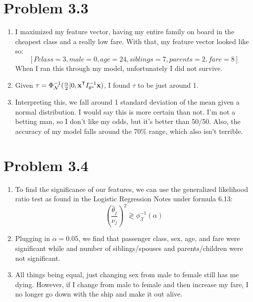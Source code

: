 \documentclass{article}
\begin{document}
\section*{Problem 3.3}
\begin{enumerate}[label=(\alph*)]
  \item I maximized my feature vector, having my entire family on board in the cheapest class and a really low fare. With that, my feature vector looked like so: \[[Pclass=3, male=0, age=24, siblings=7, parents=2, fare=8]\] When I ran this through my model, unfortunately I did not survive.
  \item Given $\tau = \Phi^{-1}_{\mathcal{N}}(\frac{\alpha}{2} | 0, \textbf{x}^{\sf{T}}I^{-1}_{\theta^*}\textbf{x})$, I found $\tau$ to be just around 1.
  \item Interpreting this, we fall around 1 standard deviation of the mean given a normal distribution. I would say this is more certain than not. I'm not a betting man, so I don't like my odds, but it's better than 50/50. Also, the accuracy of my model falls around the 70\% range, which also isn't terrible.
\end{enumerate}

\section*{Problem 3.4}
\begin{enumerate}[label=(\alph*)]
  \item To find the significance of our features, we can use the generalized likelihood ratio test as found in the Logistic Regression Notes under formula 6.13: \[(\frac{\hat{\theta}_j}{\nu_j})^2 \gtrless \phi^{-1}_{\mathcal{X}}(\alpha) \]
  \item Plugging in $\alpha = 0.05$, we find that passenger class, sex, age, and fare were significant while and number of siblings/spouses and parents/children were not significant.
  \item All things being equal, just changing sex from male to female still has me dying. However, if I change from male to female and then increase my fare, I no longer go down with the ship and make it out alive.
\end{enumerate}
\end{document}

